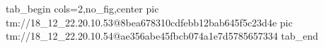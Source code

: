  
 
 
 
 

\qqSecOrig


\ifcmt
  tab_begin cols=2,no_fig,center
    pic tm://18_12_22.20.10.53@8bea678310cdfebb12bab645f5c23d4e
    pic tm://18_12_22.20.10.54@ae356abe45fbcb074a1e7d5785657334
  tab_end
\fi

